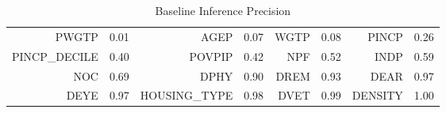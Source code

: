
            \begin{table}
                \centering
                \begin{tabular}{rl@{\hskip 3pt}|@{\hskip 3pt}rl@{\hskip 3pt}|@{\hskip 3pt}rl@{\hskip 3pt}|@{\hskip 3pt}rl}
                \toprule
        
                PWGTP & 0.01 & AGEP & 0.07 &  WGTP & 0.08 & PINCP & 0.26 \\ 
            
                PINCP\_DECILE & 0.40 & POVPIP & 0.42 &  NPF & 0.52 & INDP & 0.59 \\ 
            
                NOC & 0.69 & DPHY & 0.90 &  DREM & 0.93 & DEAR & 0.97 \\ 
            
                DEYE & 0.97 & HOUSING\_TYPE & 0.98 &  DVET & 0.99 & DENSITY & 1.00 \\ 
            
            \bottomrule
            \end{tabular}
               \caption{Baseline Inference Precision}
            \label{tab:baselines}
            \end{table}
        